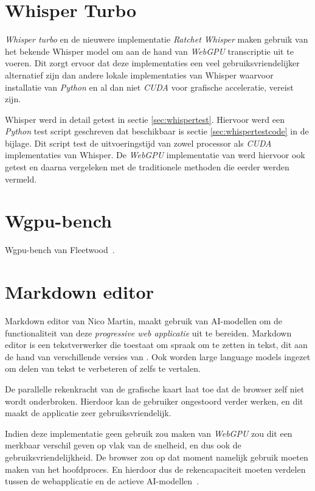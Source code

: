 \section{Whisper Turbo}

\textit{Whisper turbo} en de nieuwere implementatie \textit{Ratchet Whisper} maken gebruik van het bekende Whisper model om aan de hand van \textit{WebGPU} transcriptie uit te voeren. Dit zorgt ervoor dat deze implementaties een veel gebruiksvriendelijker alternatief zijn dan andere lokale implementaties van Whisper waarvoor installatie van \textit{Python} en al dan niet \textit{CUDA} voor grafische acceleratie, vereist zijn. 

\bigbreak{}

Whisper werd in detail getest in sectie \ref{sec:whispertest}. Hiervoor werd een \textit{Python} test script geschreven dat beschikbaar is sectie \ref{sec:whispertestcode} in de bijlage. Dit script test de uitvoeringstijd van zowel processor als \textit{CUDA} implementaties van Whisper. De \textit{WebGPU} implementatie van \textcite{Fleetwood2024} werd hiervoor ook getest en daarna vergeleken met de traditionele methoden die eerder werden vermeld.

\section{Wgpu-bench}

Wgpu-bench van Fleetwood~\autocite{Fleetwood2023d}.

\section{Markdown editor}

Markdown editor van Nico Martin, maakt gebruik van AI-modellen om de functionaliteit van deze \textit{progressive web applicatie} uit te bereiden. Markdown editor is een tekstverwerker die toestaat om spraak om te zetten in tekst, dit aan de hand van verschillende versies van \textcite{radford2022whisper}. Ook worden {large language models} ingezet om delen van tekst te verbeteren of zelfs te vertalen. 

\bigbreak{}

De parallelle rekenkracht van de grafische kaart laat toe dat de browser zelf niet wordt onderbroken. Hierdoor kan de gebruiker ongestoord verder werken, en dit maakt de applicatie zeer gebruiksvriendelijk.

\bigbreak{}

Indien deze implementatie geen gebruik zou maken van \textit{WebGPU} zou dit een merkbaar verschil geven op vlak van de snelheid, en dus ook de gebruiksvriendelijkheid. De browser zou op dat moment namelijk gebruik moeten maken van het hoofdproces. En hierdoor dus de  rekencapaciteit moeten verdelen tussen de webapplicatie en de actieve AI-modellen~\autocite{Martin2020}.

